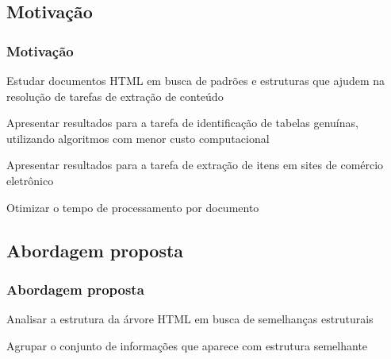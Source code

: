 \documentclass{beamer}
\newenvironment{my_itemize}{
\begin{itemize}
  \setlength{\itemsep}{5pt}
  \setlength{\parskip}{2pt}
  \setlength{\parsep}{3pt}
}{\end{itemize}}
\begin{document}
\begin{frame}
  \subsection{Motivação}
  \frametitle{Motivação}
  \begin{my_itemize}
    \item Estudar documentos HTML em busca de padrões e estruturas que ajudem na resolução de tarefas de extração de conteúdo

    \item Apresentar resultados para a tarefa de identificação de tabelas genuínas, utilizando algoritmos com menor custo computacional

    \item Apresentar resultados para a tarefa de extração de itens em sites de comércio eletrônico

    \item Otimizar o tempo de processamento por documento

  \end{my_itemize}
\end{frame}

\begin{frame}
  \subsection{Abordagem proposta}
  \frametitle{Abordagem proposta}
  \begin{my_itemize}
    \item Analisar a estrutura da árvore HTML em busca de semelhanças estruturais

    \item Agrupar o conjunto de informações que aparece com estrutura semelhante


  \end{my_itemize}
\end{frame}
\end{document}
